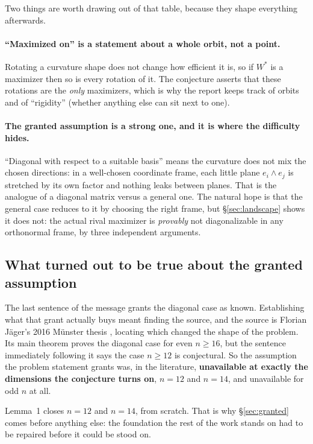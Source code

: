 Two things are worth drawing out of that table, because they shape everything afterwards.

\paragraph{``Maximized on'' is a statement about a whole orbit, not a point.} Rotating a curvature shape does not change how efficient it is, so if $W^{*}$ is a maximizer then so is every rotation of it. The conjecture asserts that these rotations are the \emph{only} maximizers, which is why the report keeps track of orbits and of ``rigidity'' (whether anything else can sit next to one).

\paragraph{The granted assumption is a strong one, and it is where the difficulty hides.} ``Diagonal with respect to a suitable basis'' means the curvature does not mix the chosen directions: in a well-chosen coordinate frame, each little plane $e_i\wedge e_j$ is stretched by its own factor and nothing leaks between planes. That is the analogue of a diagonal matrix versus a general one. The natural hope is that the general case reduces to it by choosing the right frame, but \S\ref{sec:landscape} shows it does not: the actual rival maximizer is \emph{provably} not diagonalizable in any orthonormal frame, by three independent arguments.

\subsection{What turned out to be true about the granted assumption}

The last sentence of the message grants the diagonal case as known. Establishing what that grant actually buys meant finding the source, and the source is Florian J\"ager's 2016 M\"unster thesis \cite{jaeger2016}, locating which changed the shape of the problem. Its main theorem proves the diagonal case for even $n\ge16$, but the sentence immediately following it says the case $n\ge12$ is conjectural. So the assumption the problem statement grants was, in the literature, \textbf{unavailable at exactly the dimensions the conjecture turns on}, $n=12$ and $n=14$, and unavailable for odd $n$ at all.

Lemma~1 closes $n=12$ and $n=14$, from scratch. That is why \S\ref{sec:granted} comes before anything else: the foundation the rest of the work stands on had to be repaired before it could be stood on.

